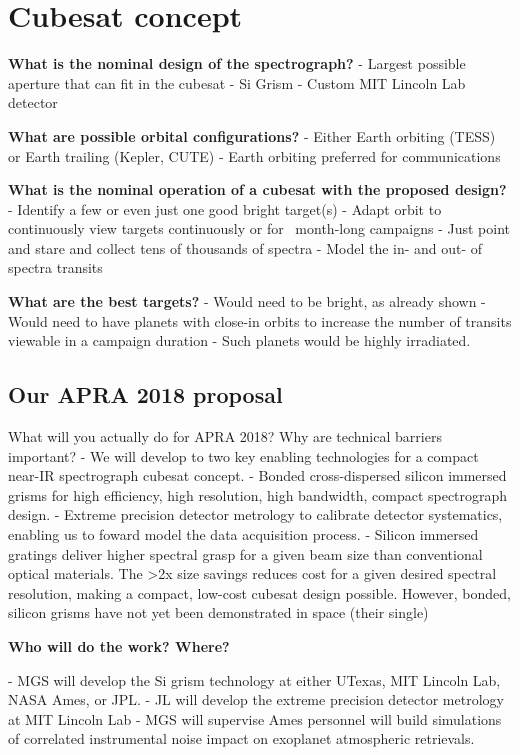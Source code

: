 \documentclass[12pt]{article}
\begin{document}
\section{Cubesat concept}


\textbf{What is the nominal design of the spectrograph?}
- Largest possible aperture that can fit in the cubesat
- Si Grism
- Custom MIT Lincoln Lab detector

\textbf{What are possible orbital configurations?}
- Either Earth orbiting (TESS) or Earth trailing (Kepler, CUTE)
- Earth orbiting preferred for communications

\textbf{What is the nominal operation of a cubesat with the proposed design?}
- Identify a few or even just one good bright target(s)
- Adapt orbit to continuously view targets continuously or for ~month-long campaigns
- Just point and stare and collect tens of thousands of spectra
- Model the in- and out- of spectra transits

\textbf{What are the best targets?}
- Would need to be bright, as already shown
- Would need to have planets with close-in orbits to increase the number of transits viewable in a campaign duration
- Such planets would be highly irradiated.


\subsection{Our APRA 2018 proposal}
What will you actually do for APRA 2018?  Why are technical barriers important?
- We will develop to two key enabling technologies for a compact near-IR spectrograph cubesat concept.
- Bonded cross-dispersed silicon immersed grisms for high efficiency, high resolution, high bandwidth, compact spectrograph design.
- Extreme precision detector metrology to calibrate detector systematics, enabling us to foward model the data acquisition process.
- Silicon immersed gratings deliver higher spectral grasp for a given beam size than conventional optical materials.  The >2x size savings reduces cost for a given desired spectral resolution, making a compact, low-cost cubesat design possible.  However, bonded, silicon grisms have not yet been demonstrated in space (their single)


\textbf{Who will do the work?  Where?}

- MGS will develop the Si grism technology at either UTexas, MIT Lincoln Lab, NASA Ames, or JPL.
- JL will develop the extreme precision detector metrology at MIT Lincoln Lab
- MGS will supervise Ames personnel will build simulations of correlated instrumental noise impact on exoplanet atmospheric retrievals.
\end{document}
